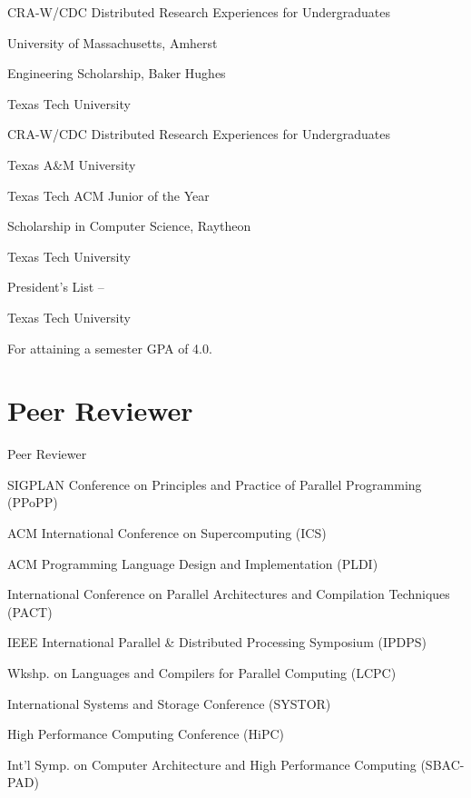 \documentclass[a4paper,10pt,oneside]{article}
\begin{document}
\begin{body}
\EntryGap
CRA-W/CDC Distributed Research Experiences for Undergraduates
\hfill
{}
\par
University of Massachusetts, Amherst

\EntryGap
Engineering Scholarship,
Baker Hughes
\hfill
{}
\par
Texas Tech University

\EntryGap
CRA-W/CDC Distributed Research Experiences for Undergraduates
\hfill
{}
\par
Texas A\&M University

\EntryGap
Texas Tech ACM Junior of the Year
\hfill
{}

\EntryGap
Scholarship in Computer Science,
Raytheon
\hfill
{}
\par
Texas Tech University

\EntryGap
President's List
\hfill
{} --
\par
Texas Tech University
\begin{detail}
For attaining a semester GPA of 4.0.
\end{detail}





\section{Peer Reviewer}
{Peer Reviewer}

SIGPLAN Conference on Principles and Practice of Parallel Programming (PPoPP)
\par ACM International Conference on Supercomputing (ICS)
\par ACM Programming Language Design and Implementation (PLDI)
\par International Conference on Parallel Architectures and Compilation Techniques (PACT)
\par IEEE International Parallel \& Distributed Processing Symposium (IPDPS)
\par Wkshp. on Languages and Compilers for Parallel Computing (LCPC)
\par International Systems and Storage Conference (SYSTOR)
\par High Performance Computing Conference (HiPC)
\par Int'l Symp. on Computer Architecture and High Performance Computing (SBAC-PAD)



\end{body}
\end{document}
